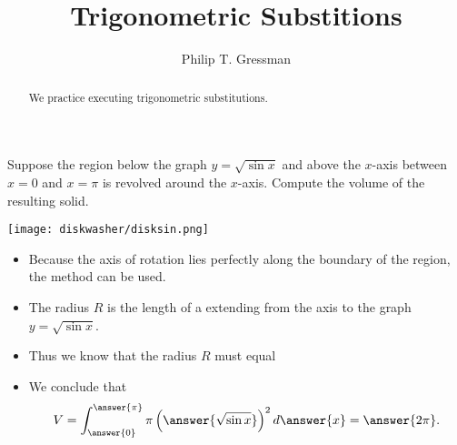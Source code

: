 \documentclass{ximera}
\title{Trigonometric Substitions}
\author{Philip T. Gressman}
\begin{document}
\begin{abstract}
  We practice executing trigonometric substitutions.
\end{abstract}
\maketitle

\begin{example}
Suppose the region below the graph $y = \sqrt{\sin x}$ and above the $x$-axis between $x=0$ and $x=\pi$ is revolved around the $x$-axis. Compute the volume of the resulting solid.
\begin{center}
\begin{image}
\texttt{[image: diskwasher/disksin.png]}
\end{image}
\end{center}
\begin{itemize}
\item Because the axis of rotation lies perfectly along the boundary of the region, the  method can be used.
\item The radius $R$ is the length of a  extending from the axis to the graph $y = \sqrt{\sin x}$.
\item Thus we know that the radius $R$ must equal
\begin{multipleChoice}\end{multipleChoice}
\item We conclude that
\[ V = \int_{\answer{0}}^{\answer{\pi}} \pi \left( \answer{\sqrt{\sin x}} \right)^2 d\answer{x} = \answer{2\pi}. \]
\end{itemize}
\end{example}
\end{document}
